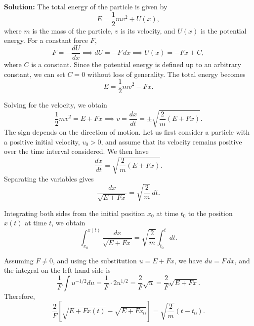 \documentclass[12pt]{article}
\begin{document}
\textbf{Solution:}
The total energy of the particle is given by
\begin{equation}
    E = \frac{1}{2}mv^2 + U(x),
\end{equation}
where $m$ is the mass of the particle, $v$ is its velocity, and $U(x)$ is the potential energy. For a constant force $F$,
\begin{equation}
    F = -\frac{dU}{dx}
    \implies dU = -F\,dx
    \implies U(x) = -Fx + C,
\end{equation}
where $C$ is a constant. Since the potential energy is defined up to an arbitrary constant, we can set $C = 0$ without loss of generality. The total energy becomes
\begin{equation}
    E = \frac{1}{2}mv^2 - Fx.
\end{equation}

Solving for the velocity, we obtain
\begin{equation}
    \frac{1}{2}mv^2 = E + Fx
    \implies
    v = \frac{dx}{dt}
    = \pm\sqrt{\frac{2}{m}(E+Fx)}.
\end{equation}
The sign depends on the direction of motion. Let us first consider a particle with a positive initial velocity, $v_0>0$, and assume that its velocity remains positive over the time interval considered. We then have
\begin{equation}
    \frac{dx}{dt} = \sqrt{\frac{2}{m}(E+Fx)}.
\end{equation}
Separating the variables gives
\begin{equation}
    \frac{dx}{\sqrt{E+Fx}}
    = \sqrt{\frac{2}{m}}\,dt.
\end{equation}

Integrating both sides from the initial position $x_0$ at time $t_0$ to the position $x(t)$ at time $t$, we obtain
\begin{equation}
    \int_{x_0}^{x(t)}
    \frac{dx}{\sqrt{E+Fx}}
    =
    \sqrt{\frac{2}{m}}
    \int_{t_0}^{t}dt.
\end{equation}

Assuming $F\neq 0$, and using the substitution $u = E + Fx$, we have $du = F\,dx$, and the integral on the left-hand side is
\begin{equation}
    \frac{1}{F} \int u^{-1/2} du = \frac{1}{F} \cdot 2u^{1/2} = \frac{2}{F}\sqrt{u} = \frac{2}{F}\sqrt{E+Fx}.
\end{equation}
Therefore,
\begin{equation}
    \frac{2}{F}
    \left[
        \sqrt{E+Fx(t)}
        -\sqrt{E+Fx_0}
    \right]
    =
    \sqrt{\frac{2}{m}}(t-t_0).
\end{equation}
\end{document}
